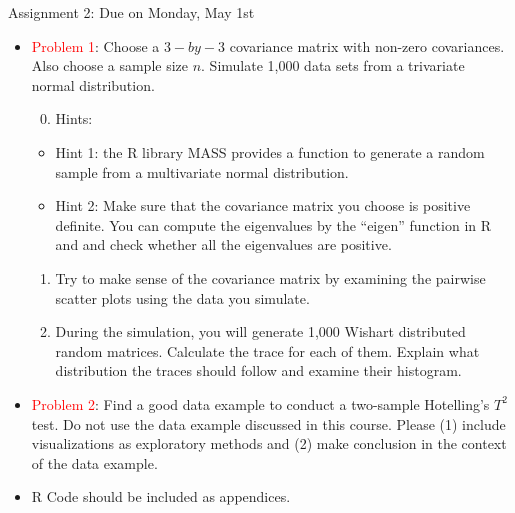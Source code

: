 \documentclass[
  ignorenonframetext,
]{beamer}
\providecommand{\tightlist}{%
  \setlength{\itemsep}{0pt}\setlength{\parskip}{0pt}}
\begin{document}
\begin{frame}{Assignment 2: Due on Monday, May 1st}
\protect\hypertarget{assignment-2-due-on-monday-may-1st}{}
\tiny

\begin{itemize}
\item
  \textcolor{red}{Problem 1}: Choose a \(3-by-3\) covariance matrix with
  non-zero covariances. Also choose a sample size \(n\). Simulate 1,000
  data sets from a trivariate normal distribution.

  \begin{enumerate}
  \setcounter{enumi}{-1}
  \tightlist
  \item
    Hints:
  \end{enumerate}

  \begin{itemize}
  \tightlist
  \item
    Hint 1: the R library MASS provides a function to generate a random
    sample from a multivariate normal distribution.
  \item
    Hint 2: Make sure that the covariance matrix you choose is positive
    definite. You can compute the eigenvalues by the ``eigen'' function
    in R and and check whether all the eigenvalues are positive.
  \end{itemize}

  \begin{enumerate}
  \tightlist
  \item
    Try to make sense of the covariance matrix by examining the pairwise
    scatter plots using the data you simulate.
  \item
    During the simulation, you will generate 1,000 Wishart distributed
    random matrices. Calculate the trace for each of them. Explain what
    distribution the traces should follow and examine their histogram.
  \end{enumerate}
\item
  \textcolor{red}{Problem 2}: Find a good data example to conduct a
  two-sample Hotelling's \(T^2\) test. Do not use the data example
  discussed in this course. Please (1) include visualizations as
  exploratory methods and (2) make conclusion in the context of the data
  example.
\item
  R Code should be included as appendices.
\end{itemize}

\normalsize
\end{frame}
\end{document}
